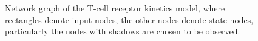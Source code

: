  \begin{figure}[thpb]
      \centering
      
      \caption{Network graph of the T-cell receptor kinetics model, where rectangles denote input nodes, the other nodes denote state nodes, particularly the nodes with shadows are chosen to be observed.}
      \label{fig:6}
  \end{figure}

